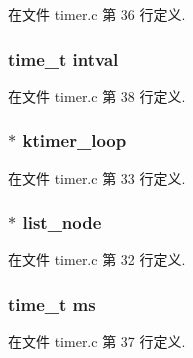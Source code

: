 在文件 timer.\+c 第 36 行定义.

\hypertarget{struct__ktimer__t_ac51a900086331031163d965952207477}{}
\subsubsection[{intval}]{\setlength{\rightskip}{0pt plus 5cm}time\+\_\+t intval}\label{struct__ktimer__t_ac51a900086331031163d965952207477}


在文件 timer.\+c 第 38 行定义.

\hypertarget{struct__ktimer__t_afecd1f25004f7b34c54195e15b9b6f26}{}
\subsubsection[{ktimer\+\_\+loop}]{$\ast$ ktimer\+\_\+loop}\label{struct__ktimer__t_afecd1f25004f7b34c54195e15b9b6f26}


在文件 timer.\+c 第 33 行定义.

\hypertarget{struct__ktimer__t_a1077e5b0269760e53b61c2d62c5ae6a3}{}
\subsubsection[{list\+\_\+node}]{$\ast$ list\+\_\+node}\label{struct__ktimer__t_a1077e5b0269760e53b61c2d62c5ae6a3}


在文件 timer.\+c 第 32 行定义.

\hypertarget{struct__ktimer__t_ac00f09be782cfb10bb1b179c189ad18b}{}
\subsubsection[{ms}]{\setlength{\rightskip}{0pt plus 5cm}time\+\_\+t ms}\label{struct__ktimer__t_ac00f09be782cfb10bb1b179c189ad18b}


在文件 timer.\+c 第 37 行定义.

